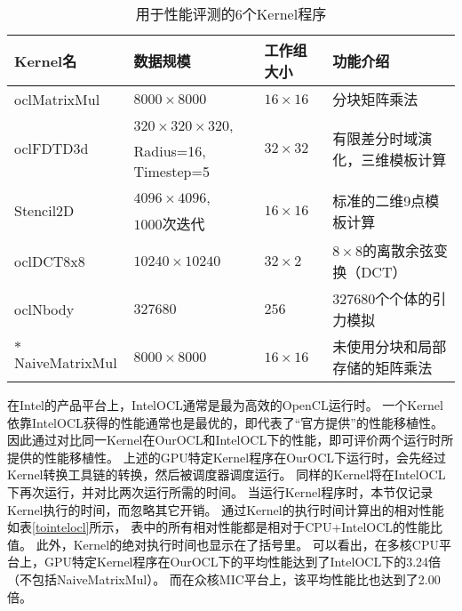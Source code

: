 \begin{table}[htb]
	\caption{用于性能评测的6个Kernel程序}
	\centering
	\scalebox{0.9} {
	\begin{tabular}{ p{2.7cm} p{3.7cm} p{2cm} p{6cm} }
		\toprule[1pt]
		Kernel名 & 数据规模 & 工作组大小      & 功能介绍\\
		\midrule[0.5pt]
		oclMatrixMul & $8000\times8000$ & $16\times16$ & 分块矩阵乘法\\
		\multirow{2}{*}{oclFDTD3d} & $320\times320\times320$,  & \multirow{2}{*}{$32\times32$} & \multirow{2}{*}{有限差分时域演化，三维模板计算}\\
		& Radius=16, Timestep=5	 &				&  \\
		\multirow{2}{*}{Stencil2D} & $4096\times4096$,  & \multirow{2}{*}{$16\times16$} & \multirow{2}{*}{标准的二维9点模板计算}\\
		& $1000$次迭代  &			  &		\\
		oclDCT8x8 & $10240\times10240$ & $32\times2$ &$8\times8$的离散余弦变换（DCT）\\
		oclNbody & $327680$ & $256$ & 327680个个体的引力模拟\\
		$*$NaiveMatrixMul & $8000\times8000$ & $16\times16$ & 未使用分块和局部存储的矩阵乘法\\
		\bottomrule[1pt]
	\end{tabular}
	}
	\label{benchmarks}
\end{table}

在Intel的产品平台上，IntelOCL通常是最为高效的OpenCL运行时。
一个Kernel依靠IntelOCL获得的性能通常也是最优的，即代表了``官方提供''的性能移植性。
因此通过对比同一Kernel在OurOCL和IntelOCL下的性能，即可评价两个运行时所提供的性能移植性。
上述的GPU特定Kernel程序在OurOCL下运行时，会先经过Kernel转换工具链的转换，然后被调度器调度运行。
同样的Kernel将在IntelOCL下再次运行，并对比两次运行所需的时间。
当运行Kernel程序时，本节仅记录Kernel执行的时间，而忽略其它开销。
通过Kernel的执行时间计算出的相对性能如表\ref{tointelocl}所示，
表中的所有相对性能都是相对于CPU+IntelOCL的性能比值。
此外，Kernel的绝对执行时间也显示在了括号里。
可以看出，在多核CPU平台上，GPU特定Kernel程序在OurOCL下的平均性能达到了IntelOCL下的3.24倍（不包括NaiveMatrixMul）。
而在众核MIC平台上，该平均性能比也达到了2.00倍。

